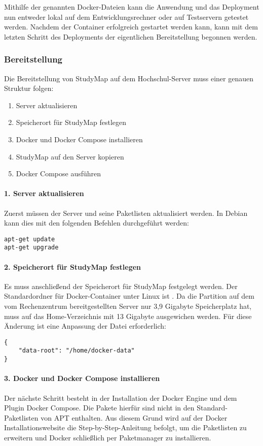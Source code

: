 Mithilfe der genannten Docker-Dateien kann die Anwendung und das Deployment nun entweder lokal auf dem Entwicklungsrechner oder auf Testservern getestet werden. Nachdem der Container erfolgreich gestartet werden kann, kann mit dem letzten Schritt des Deployments der eigentlichen Bereitstellung begonnen werden.

\subsubsection{Bereitstellung}
Die Bereitstellung von StudyMap auf dem Hochschul-Server muss einer genauen Struktur folgen:
\begin{enumerate}
    \item Server aktualisieren
    \item Speicherort für StudyMap festlegen
    \item Docker und Docker Compose installieren
    \item StudyMap auf den Server kopieren
    \item Docker Compose ausführen
\end{enumerate}

\paragraph*{1. Server aktualisieren}
Zuerst müssen der Server und seine Paketlisten aktualisiert werden. In Debian kann dies mit den folgenden Befehlen durchgeführt werden:
\begin{lstlisting}[style=Python]
apt-get update
apt-get upgrade
\end{lstlisting}

\paragraph*{2. Speicherort für StudyMap festlegen}
Es muss anschließend der Speicherort für StudyMap festgelegt werden. Der Standardordner für Docker-Container unter Linux ist . Da die Partition auf dem vom Rechenzentrum bereitgestellten Server nur 3,9 Gigabyte Speicherplatz hat, muss auf das Home-Verzeichnis mit 13 Gigabyte ausgewichen werden. Für diese Änderung ist eine Anpassung der Datei  erforderlich:
\begin{lstlisting}[style=Python]
{
    "data-root": "/home/docker-data"
}
\end{lstlisting}

\paragraph*{3. Docker und Docker Compose installieren}
Der nächste Schritt besteht in der Installation der Docker Engine und dem Plugin Docker Compose. Die Pakete hierfür sind nicht in den Standard-Paketlisten von APT enthalten. Aus diesem Grund wird auf der Docker Installationswebsite die Step-by-Step-Anleitung befolgt, um die Paketlisten zu erweitern und Docker schließlich per Paketmanager zu installieren.

